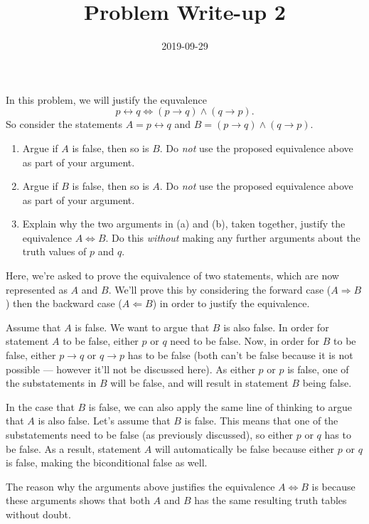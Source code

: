\documentclass[a4paper,12pt]{article}
\title{Problem Write-up 2}
\date{2019-09-29}
\begin{document}
    \begin{problem}
        In this problem, we will justify the equvalence \[p \leftrightarrow q \Leftrightarrow (p \to q) \wedge (q \to p).\]
        So consider the statements \(A = p \leftrightarrow q\) and \(B = (p \to q) \wedge (q \to p)\).

        \begin{enumerate}
                \item Argue if \(A\) is false, then so is \(B\). Do \textit{not} use the proposed equivalence above as part of your argument.
                \item Argue if \(B\) is false, then so is \(A\). Do \textit{not} use the proposed equivalence above as part of your argument.
                \item Explain why the two arguments in (a) and (b), taken together, justify the equivalence \(A \Leftrightarrow B\). Do this \textit{without} making any further arguments about the truth values of \(p\) and \(q\).
        \end{enumerate}
    \end{problem}

    \begin{answer}
        Here, we're asked to prove the equivalence of two statements, which are now represented as \(A\) and \(B\). We'll prove this by considering the forward case (\(A \Rightarrow B\)) then the backward case (\( A \Leftarrow B \)) in order to justify the equivalence.

        Assume that \(A\) is false. We want to argue that \(B\) is also false. In order for statement \(A\) to be false, either \(p\) or \(q\) need to be false. Now, in order for \(B\) to be false, either \(p \to q\) or \(q \to p\) has to be false (both can't be false because it is not possible --- however it'll not be discussed here). As either \(p\) or \(p\) is false, one of the substatements in \(B\) will be false, and will result in statement \(B\) being false.

        In the case that \(B\) is false, we can also apply the same line of thinking to argue that \(A\) is also false. Let's assume that \(B\) is false. This means that one of the substatements need to be false (as previously discussed), so either \(p\) or \(q\) has to be false. As a result, statement \(A\) will automatically be false because either \(p\) or \(q\) is false, making the biconditional false as well.

        The reason why the arguments above justifies the equivalence \(A \Leftrightarrow B\) is because these arguments shows that both \(A\) and \(B\) has the same resulting truth tables without doubt.
    \end{answer}
\end{document}
